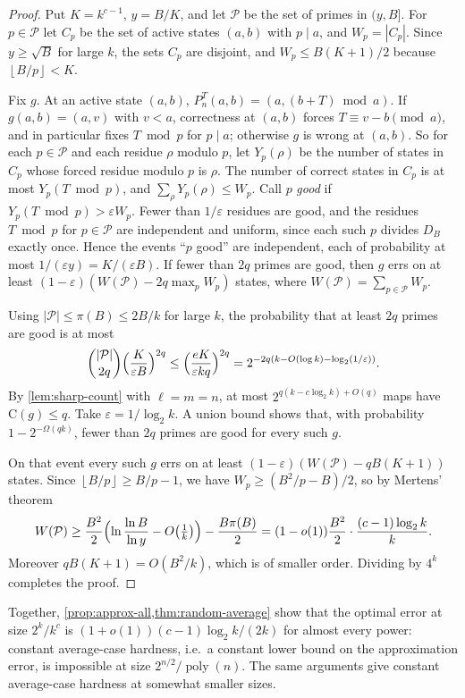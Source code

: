 \documentclass[11pt]{article}
\theoremstyle{definition}
\theoremstyle{remark}
\newcommand{\CC}{\mathrm{C}}
\newcommand{\poly}{\operatorname{poly}}
\newcommand{\floor}[1]{\left\lfloor #1\right\rfloor}
\numberwithin{equation}{section}
\begin{document}
\begin{proof}
Put $K=k^{c-1}$, $y=B/K$, and let $\mathcal P$ be the set of primes in
$(y,B]$.  For $p\in\mathcal P$ let $C_p$ be the set of active states
$(a,b)$ with $p\mid a$, and $W_p=|C_p|$.  Since $y\geq\sqrt B$ for large
$k$, the sets $C_p$ are disjoint, and $W_p\leq B(K+1)/2$ because
$\floor{B/p}<K$.

Fix $g$.  At an active state $(a,b)$, $P_n^T(a,b)=(a,(b+T)\bmod a)$.  If
$g(a,b)=(a,v)$ with $v<a$, correctness at $(a,b)$ forces
$T\equiv v-b\pmod a$, and in particular fixes $T\bmod p$ for $p\mid a$;
otherwise $g$ is wrong at $(a,b)$.  So for each $p\in\mathcal P$ and each
residue $\rho$ modulo $p$, let $Y_p(\rho)$ be the number of states in $C_p$
whose forced residue modulo $p$ is $\rho$.  The number of correct states
in $C_p$ is at most $Y_p(T\bmod p)$, and $\sum_\rho Y_p(\rho)\leq W_p$.
Call $p$ \emph{good} if $Y_p(T\bmod p)>\varepsilon W_p$.  Fewer than
$1/\varepsilon$ residues are good, and the residues $T\bmod p$ for
$p\in\mathcal P$ are independent and uniform, since each such $p$ divides
$D_B$ exactly once.  Hence the events ``$p$ good'' are independent, each
of probability at most $1/(\varepsilon y)=K/(\varepsilon B)$.  If fewer
than $2q$ primes are good, then $g$ errs on at least
$(1-\varepsilon)(W(\mathcal P)-2q\max_pW_p)$ states, where
$W(\mathcal P)=\sum_{p\in\mathcal P}W_p$.

Using $|\mathcal P|\leq\pi(B)\leq 2B/k$ for large $k$, the probability that
at least $2q$ primes are good is at most
\[
  \binom{|\mathcal P|}{2q}\Bigl(\frac{K}{\varepsilon B}\Bigr)^{2q}
  \leq\Bigl(\frac{eK}{\varepsilon kq}\Bigr)^{2q}
  =2^{-2q(k-O(\log k)-\log_2(1/\varepsilon))}.
\]
By \cref{lem:sharp-count} with $\ell=m=n$, at most
$2^{q(k-c\log_2k)+O(q)}$ maps have $\CC(g)\leq q$.  Take
$\varepsilon=1/\log_2k$.  A union bound shows that, with probability
$1-2^{-\Omega(qk)}$, fewer than $2q$ primes are good for every such $g$.

On that event every such $g$ errs on at least
$(1-\varepsilon)(W(\mathcal P)-qB(K+1))$ states.  Since
$\floor{B/p}\geq B/p-1$, we have $W_p\geq(B^2/p-B)/2$, so by Mertens'
theorem
\[
  W(\mathcal P)\geq\frac{B^2}2\Bigl(\ln\frac{\ln B}{\ln y}-O\bigl(\tfrac1k\bigr)\Bigr)
     -\frac{B\pi(B)}2
   =(1-o(1))\frac{B^2}2\cdot\frac{(c-1)\log_2k}{k}.
\]
Moreover $qB(K+1)=O(B^2/k)$, which is of smaller order.  Dividing by
$4^k$ completes the proof.
\end{proof}

Together, \cref{prop:approx-all,thm:random-average} show that the optimal
error at size $2^k/k^c$ is $(1+o(1))(c-1)\log_2k/(2k)$ for almost every
power: constant average-case hardness, i.e.\ a constant lower bound on
the approximation error, is impossible at size $2^{n/2}/\poly(n)$.  The
same arguments give constant average-case hardness at somewhat smaller
sizes.
\end{document}
